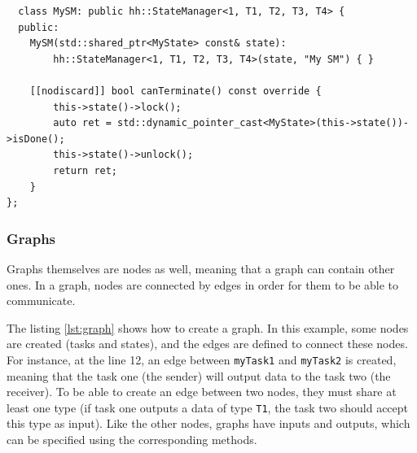 \begin{listing}[ht!]
\begin{verbatim}
  class MySM: public hh::StateManager<1, T1, T2, T3, T4> {
  public:
    MySM(std::shared_ptr<MyState> const& state):
        hh::StateManager<1, T1, T2, T3, T4>(state, "My SM") { }

    [[nodiscard]] bool canTerminate() const override {
        this->state()->lock();
        auto ret = std::dynamic_pointer_cast<MyState>(this->state())->isDone();
        this->state()->unlock();
        return ret;
    }
};
\end{verbatim}
\label{lst:statemanager}
\end{listing}

\subsubsection{Graphs}

Graphs themselves are nodes as well, meaning that a graph can contain other
ones. In a graph, nodes are connected by edges in order for them to be able to
communicate.

The listing \ref{lst:graph} shows how to create a graph. In this example, some
nodes are created (tasks and states), and the edges are defined to connect these
nodes. For instance, at the line 12, an edge between \texttt{myTask1}
and \texttt{myTask2} is created, meaning that the task one (the sender) will output
data to the task two (the receiver). To be able to create an edge between two
nodes, they must share at least one type (if task one outputs a data of type
\texttt{T1}, the task two should accept this type as input). Like the other
nodes, graphs have inputs and outputs, which can be specified using the
corresponding methods.
\clearpage{}

